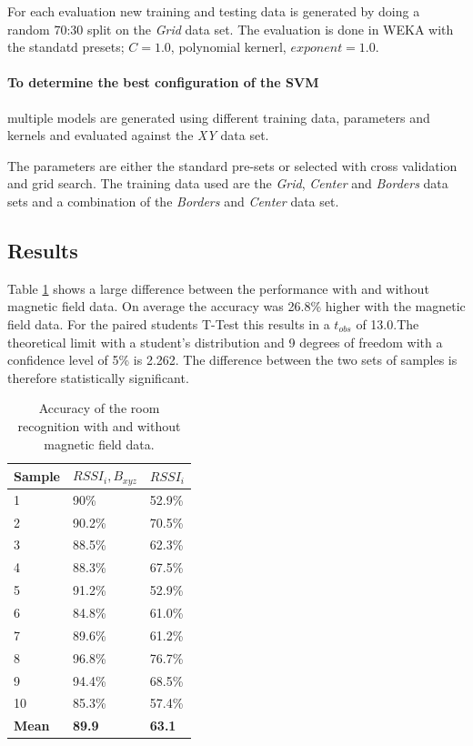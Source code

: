 For each evaluation new training and testing data is generated by doing a random 70:30 split on the \emph{Grid} data set. The evaluation is done in WEKA with the standatd presets; \(C=1.0\), polynomial kernerl, \(exponent=1.0\).

\paragraph{To determine the best configuration of the SVM} multiple models are generated using different training data, parameters and kernels and evaluated against the \emph{XY} data set.

The parameters are either the standard pre-sets or selected with cross validation and grid search. The training data used are the \emph{Grid}, \emph{Center} and \emph{Borders} data sets and a combination of the \emph{Borders} and \emph{Center} data set.

\subsection{Results}

Table \ref{tab:RoomRecognitionMagneticField} shows a large difference between the performance with and without magnetic field data. On average the accuracy was 26.8\% higher with the magnetic field data. For the paired students T-Test this results in a $t_{obs}$ of 13.0.The theoretical limit with a student's distribution and 9 degrees of freedom with a confidence level of 5\% is 2.262. The difference between the two sets of samples is therefore statistically significant.

\begin{table}
\centering
\begin{tabular}{l l l}
\toprule
\textbf{Sample}&\boldmath$RSSI_{i},B_{xyz}$&\boldmath$RSSI_{i}$ \\
\midrule
1&90\%&52.9\% \\
2&90.2\%&70.5\% \\
3&88.5\%&62.3\% \\
4&88.3\%&67.5\% \\
5&91.2\%&52.9\% \\
6&84.8\%&61.0\% \\
7&89.6\%&61.2\% \\
8&96.8\%&76.7\% \\
9&94.4\%&68.5\% \\
10&85.3\%&57.4\% \\
\textbf{Mean}&\textbf{89.9}&\textbf{63.1} \\
\bottomrule
\end{tabular}
\caption[Room Recognition - Magnetic Field]{Accuracy of the room recognition with and without magnetic field data.}
\label{tab:RoomRecognitionMagneticField}
\end{table}

